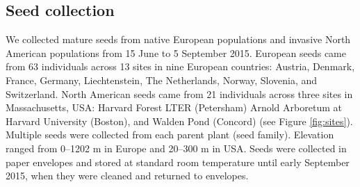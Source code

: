 \documentclass[12pt]{article}\usepackage[]{graphicx}\usepackage[]{color}
\begin{document}
	\subsection{Seed collection} 
	We collected mature seeds from native European populations and invasive North American populations from 15 June to 5 September 2015. European seeds came from 63 individuals across 13 sites in nine European countries: Austria, Denmark, France, Germany, Liechtenstein, The Netherlands, Norway, Slovenia, and Switzerland.  North American seeds came from 21 individuals across three sites  in Massachusetts, USA: Harvard Forest LTER (Petersham) Arnold Arboretum at Harvard University (Boston), and Walden Pond (Concord) (see Figure \ref{fig:sites}). Multiple seeds were collected from each parent plant (seed family). Elevation ranged from 0--1202 m in Europe and 20--300 m in USA. Seeds were collected in paper envelopes and stored at standard room temperature until early September 2015, when they were cleaned and returned to envelopes.  %
	
	
\end{document}
